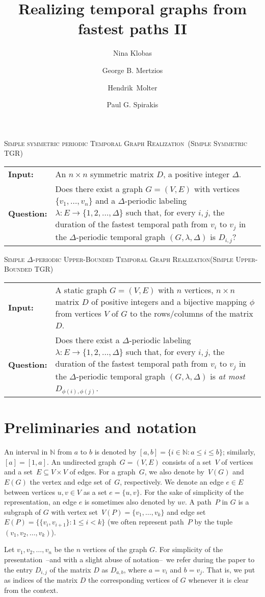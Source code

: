 \documentclass[a4paper,UKenglish,cleveref, autoref, thm-restate]{lipics-v2021}
\title{Realizing temporal graphs from fastest paths II} %
\author{Nina Klobas}{Department of Computer Science, Durham University, UK}{nina.klobas@durham.ac.uk}{ https://orcid.org/0000-0002-8024-5782}{}
\author{George B. Mertzios}{Department of Computer Science, Durham University, UK}{george.mertzios@durham.ac.uk}{https://orcid.org/0000-0001-7182-585X}{Supported by the EPSRC grant EP/P020372/1.}
\author{Hendrik~Molter}{Department of Computer Science, Ben-Gurion~University~of~the~Negev, 
	Beer-Sheva, 
	Israel}{molterh@post.bgu.ac.il}{https://orcid.org/0000-0002-4590-798X}{Supported by the ISF, grant No.~1456/18, and the ERC, grant number 949707.}
\author{Paul G. Spirakis}{Department of Computer Science, University of Liverpool, UK}{p.spirakis@liverpool.ac.uk}{https://orcid.org/0000-0001-5396-3749}{Supported by the EPSRC grant EP/P02002X/1.}
\makeatletter
\newcommand{\problemdef}[3]{
	\begin{center}
		\begin{minipage}{0.95\textwidth}
			\noindent
			#1
			\vspace{5pt}\\
			\setlength{\tabcolsep}{3pt}
			\begin{tabularx}{\textwidth}{@{}lX@{}}
				\textbf{Input:}& #2 \\
				\textbf{Question:}& #3
			\end{tabularx}
		\end{minipage}
	\end{center}
}
\newcommand{\deltaSymExactLong}{\textsc{Simple symmetric periodic Temporal Graph Realization}}
\newcommand{\deltaSymExact}{\textsc{Simple Symmetric TGR}}
\newcommand{\DeltaUpperBoundLong}{\textsc{Simple $\Delta$-periodic Upper-Bounded Temporal Graph Realization}}
\newcommand{\deltaUpperBound}{\textsc{Simple Upper-Bounded TGR}}
\makeatother
\begin{document}
	\maketitle
	
\problemdef{\deltaSymExactLong\ (\deltaSymExact)}
{An $n \times n$ symmetric matrix $D$, a positive integer $\Delta$.}
{Does there exist a graph $G=(V,E)$ with vertices $\{v_1,\ldots,v_{n}\}$ 
	and a $\Delta$-periodic labeling $\lambda: E \rightarrow \{1,2,\ldots,\Delta\}$ such that, 
	for every $i,j$, the duration of the fastest temporal path from $v_i$ to $v_j$ in the $\Delta$-periodic temporal graph $(G,\lambda,\Delta)$ is $D_{i,j}$?}
	
\problemdef{\DeltaUpperBoundLong (\deltaUpperBound)}
{A static graph $G=(V,E)$ with $n$ vertices, $n \times n$ matrix $D$ of positive integers and a bijective mapping $\phi$ from vertices $V$ of $G$ to the rows/columns of the matrix $D$.}
{Does there exist a $\Delta$-periodic labeling $\lambda: E \rightarrow \{1,2,\ldots,\Delta\}$ such that, 
	for every $i,j$, the duration of the fastest temporal path from $v_i$ to $v_j$ in the $\Delta$-periodic temporal graph $(G,\lambda,\Delta)$ is \emph{at most} $D_{\phi(i),\phi(j)}$.}

\section{Preliminaries and notation}

An interval in $\mathbb N$ from $a$ to $b$ is denoted by $[a,b] = \{ i\in \mathbb N  :  a \leq i \leq b\}$; similarly, $[a] = [1,a]$.
An undirected graph~$G=(V,E)$ consists of a set~$V$ of vertices 
and a set~$E \subseteq V \times V$ of edges.
For a graph~$G$, we also denote by~$V(G)$ and~$E(G)$ the vertex and edge set of~$G$, respectively.
We denote an edge $e \in E$ between vertices $u,v \in V$ as a set $e=\{u,v\}$.
For the sake of simplicity of the representation, an edge $e$ is sometimes also denoted by $uv$. 
A path~$P$ in $G$ is a subgraph of $G$ with vertex set~$V(P)=\{v_1,\dots,v_k\}$ and edge set~$E(P)=\{\{v_i,v_{i+1}\} :  1\leq i<k\}$
(we often represent path~$P$ by the tuple~$(v_1,v_2,\dots,v_k)$).

Let $v_1,v_2,\ldots,v_n$ be the $n$ vertices of the graph $G$. 
For simplicity of the presentation~--and with a slight abuse of notation--~we refer during the paper to the entry $D_{i,j}$ of the matrix $D$ as 
$D_{a,b}$, where $a=v_i$ and $b=v_j$. That is, we put as indices of the matrix $D$ the corresponding vertices of $G$ whenever it is clear from the context.
\end{document}

